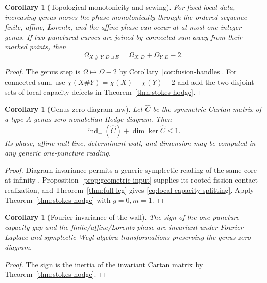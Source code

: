 \documentclass[11pt,a4paper]{amsart}
\theoremstyle{plain}
\newtheorem{corollary}[theorem]{Corollary}
\theoremstyle{definition}
\newcommand{\indm}{\operatorname{ind}_{-}}
\begin{document}
\begin{corollary}[Topological monotonicity and sewing]\label{cor:topological-monotonicity}
For fixed local data, increasing genus moves the phase monotonically through the ordered sequence
finite, affine, Lorentz, and the affine phase can occur at at most one integer genus.  If two
punctured curves are joined by connected sum away from their marked points, then
\begin{equation}\label{eq:connected-sum-gap}
 \Omega_{X\mathbin\#Y,D\sqcup E}=\Omega_{X,D}+\Omega_{Y,E}-2.
\end{equation}
\end{corollary}

\begin{proof}
The genus step is $\Omega\mapsto\Omega-2$ by Corollary~\ref{cor:fusion-handles}.  For connected sum,
use $\chi(X\#Y)=\chi(X)+\chi(Y)-2$ and add the two disjoint sets of local capacity defects in
Theorem~\ref{thm:stokes-hodge}.
\end{proof}

\begin{corollary}[Genus-zero diagram law]\label{thm:global}
Let $\widehat C$ be the symmetric Cartan matrix of a type-$A$ genus-zero nonabelian Hodge diagram.
Then
\begin{equation}\label{eq:global-index}
 \indm(\widehat C)+\dim\ker\widehat C\le1.
\end{equation}
Its phase, affine null line, determinant wall, and dimension may be computed in any generic
one-puncture reading.
\end{corollary}

\begin{proof}
Diagram invariance permits a generic symplectic reading of the same core at infinity
\cite{Doucot2021Diagrams,Doucot2026Basic}.  Proposition~\ref{prop:geometric-input} supplies its
rooted fission-contact realization, and Theorem~\ref{thm:full-leg} gives
\eqref{eq:local-capacity-splitting}.  Apply Theorem~\ref{thm:stokes-hodge} with $g=0,m=1$.
\end{proof}

\begin{corollary}[Fourier invariance of the wall]\label{cor:Fourier-wall}
The sign of the one-puncture capacity gap and the finite/affine/Lorentz phase are invariant under
Fourier--Laplace and symplectic Weyl-algebra transformations preserving the genus-zero diagram.
\end{corollary}

\begin{proof}
The sign is the inertia of the invariant Cartan matrix by Theorem~\ref{thm:stokes-hodge}.
\end{proof}
\end{document}
